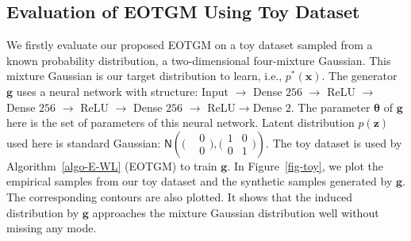 \subsection{Evaluation of EOTGM Using Toy Dataset}\label{subsec-mg}

{We firstly evaluate our proposed EOTGM on a toy dataset sampled from a known probability distribution, a two-dimensional four-mixture Gaussian. This mixture Gaussian is our target distribution to learn, i.e., $p^{\ast}(\bm{x})$. The generator $\bm{g}$ uses a neural network with structure: Input $\rightarrow$ Dense $256$ $\rightarrow$ ReLU $\rightarrow$ Dense $256$ $\rightarrow$ ReLU $\rightarrow$ Dense $256$ $\rightarrow$ ReLU$\rightarrow$Dense $2$. The parameter $\bm{\theta} $ of $\bm{g}$ here is the set of parameters of this neural network. Latent distribution $p(\bm{z})$ used here is standard Gaussian: $\mathsf{N}\left(\bigl(\begin{smallmatrix}& 0\\
    &0\end{smallmatrix}\bigr) ,\bigl( \begin{smallmatrix}1 & 0\\ 0 &
    1\end{smallmatrix}  \bigr)\right)$.
The toy dataset is used by Algorithm~\ref{algo-E-WL} (EOTGM) to train $\bm{g}$. In Figure~\ref{fig-toy}, we plot the empirical samples from our toy dataset and the synthetic samples generated by $\bm{g}$. The corresponding contours are also plotted. It shows that the induced distribution by $\bm{g}$ approaches the mixture Gaussian distribution well without missing any mode.}          

